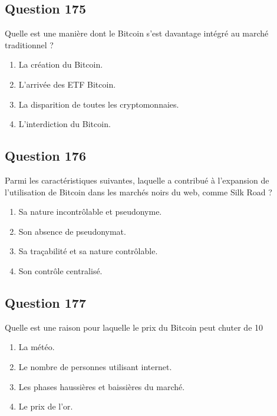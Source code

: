 \documentclass[12pt,a4paper]{article}
\begin{document}
\bigskip


\subsection*{Question 175}
Quelle est une manière dont le Bitcoin s'est davantage intégré au marché traditionnel ?

\begin{enumerate}[label=\Alph*., leftmargin=*]
\item La création du Bitcoin.
\item L'arrivée des ETF Bitcoin.
\item La disparition de toutes les cryptomonnaies.
\item L'interdiction du Bitcoin.
\end{enumerate}

\bigskip


\subsection*{Question 176}
Parmi les caractéristiques suivantes, laquelle a contribué à l'expansion de l'utilisation de Bitcoin dans les marchés noirs du web, comme Silk Road ?

\begin{enumerate}[label=\Alph*., leftmargin=*]
\item Sa nature incontrôlable et pseudonyme.
\item Son absence de pseudonymat.
\item Sa traçabilité et sa nature contrôlable.
\item Son contrôle centralisé.
\end{enumerate}

\bigskip


\subsection*{Question 177}
Quelle est une raison pour laquelle le prix du Bitcoin peut chuter de 10 %

\begin{enumerate}[label=\Alph*., leftmargin=*]
\item La météo.
\item Le nombre de personnes utilisant internet.
\item Les phases haussières et baissières du marché.
\item Le prix de l'or.
\end{enumerate}
\end{document}
